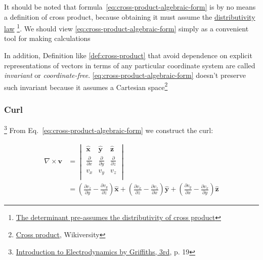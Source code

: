 \begin{tcolorbox}[
    parbox=false,
    enhanced,
    colback=red!5!white,colframe=red!75!black,
    watermark tikz={\draw[line width=2mm] circle (1cm) node{\fontfamily{ptm}\fontseries{b}\fontsize{20mm}{20mm}\selectfont !};}
]
    It should be noted that formula~\ref{eq:cross-product-algebraic-form} is by no means a definition of cross product,
    because obtaining it must assume the \hyperref[eq:cross-product-assumed-distributivity]{distributivity law}
    \footnote{\href{https://math.stackexchange.com/questions/362139/how-to-prove-the-distributive-property-of-cross-product\#comment5670827\_362161}{The determinant pre-assumes the distributivity of cross product}}.
    We should view \ref{eq:cross-product-algebraic-form} simply as a convenient tool for making calculations

    In addition, Definition like \ref{def:cross-product} that avoid dependence on explicit representations of vectors in
    terms of any particular coordinate system are called \textit{invariant} or \textit{coordinate-free}.
    \ref{eq:cross-product-algebraic-form} doesn't preserve such invariant because it assumes a Cartesian
    space\footnote{\href{https://en.wikiversity.org/wiki/Cross_product\#Algebraic\_Definition}{Cross product}, Wikiversity}
\end{tcolorbox}

\subsubsection{Curl}

\footnote{\href{https://trello.com/c/U6HhhDq6}{Introduction to Electrodynamics by Griffiths, 3rd}, p. 19} From
Eq.~\ref{eq:cross-product-algebraic-form} we construct the curl:

\begin{align}
    \nabla \times \boldsymbol{v} &=
    \begin{vmatrix}
        \boldsymbol{\hat{x}}        & \boldsymbol{\hat{y}}        & \boldsymbol{\hat{z}} \\
        \frac{\partial}{\partial x} & \frac{\partial}{\partial y} & \frac{\partial}{\partial z} \\
        v_x                         & v_y                         & v_z \\
    \end{vmatrix} \\ &=
    \left( \frac{\partial v_z}{\partial y} - \frac{\partial v_y}{\partial z} \right)\boldsymbol{\hat{x}} + \left( \frac{\partial v_x}{\partial z} - \frac{\partial v_z}{\partial x} \right)\boldsymbol{\hat{y}} + \left( \frac{\partial v_y}{\partial x} - \frac{\partial v_x}{\partial y} \right)\boldsymbol{\hat{z}}
\end{align}

